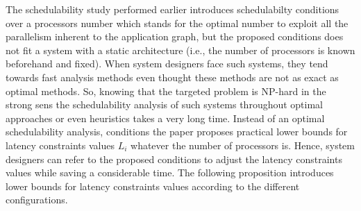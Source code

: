 \documentclass{ijcaArticle}
\begin{document}
\vskip4mm
The schedulability study performed earlier introduces schedulabilty conditions over a processors number which stands for the optimal number to exploit all the parallelism inherent to the application graph, but the proposed conditions does not fit a system with a static architecture (i.e., the number of processors is known beforehand and fixed). When system designers face such systems, 
they tend towards fast analysis methods even thought these methods are not as exact as optimal methods. So, knowing that the targeted problem is NP-hard in the strong sens the schedulability analysis of such systems throughout optimal approaches or even heuristics takes a very long time.  Instead of an optimal schedulability analysis, conditions the paper proposes practical lower bounds for latency constraints values $L_i$ whatever the number of processors is. Hence, system designers can refer to the proposed conditions 
to adjust the latency constraints values while saving a considerable time.  The following proposition introduces lower bounds for latency constraints values according to the different configurations.
\end{document}
